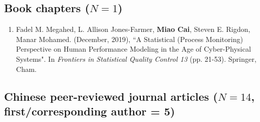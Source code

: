 \documentclass[11pt, a4paper]{article}
\newcommand{\years}[1]{\marginnote{\scriptsize #1}}
\begin{document}
	
	
	\subsection*{Book chapters ($N=1$)}
	\begin{enumerate}[leftmargin=0ex,itemsep=1ex]
		\item \years{2019}Fadel M. Megahed, L. Allison Jones-Farmer, \textbf{Miao Cai}, Steven E. Rigdon, Manar Mohamed. (December, 2019), ``A Statistical (Process Monitoring) Perspective on Human Performance Modeling in the Age of Cyber-Physical Systems". In \textit{Frontiers in Statistical Quality Control 13} (pp. 21-53). Springer, Cham.
	\end{enumerate}
	
	
	
	\subsection*{Chinese peer-reviewed journal articles ($N=14$, first/corresponding author = 5)}
\end{document}
